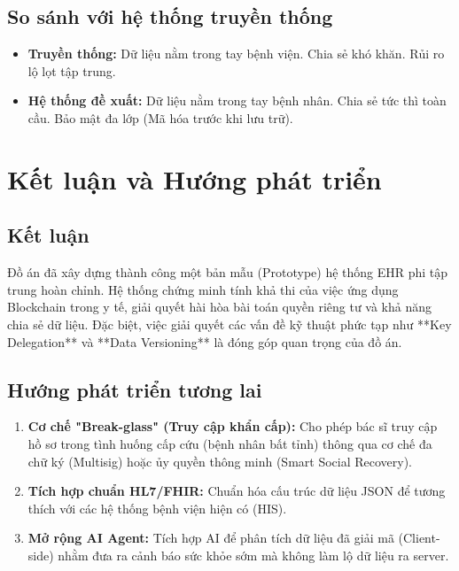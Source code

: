 \documentclass[12pt,a4paper]{report}
\begin{document}
\section{So sánh với hệ thống truyền thống}
\begin{itemize}
    \item \textbf{Truyền thống:} Dữ liệu nằm trong tay bệnh viện. Chia sẻ khó khăn. Rủi ro lộ lọt tập trung.
    \item \textbf{Hệ thống đề xuất:} Dữ liệu nằm trong tay bệnh nhân. Chia sẻ tức thì toàn cầu. Bảo mật đa lớp (Mã hóa trước khi lưu trữ).
\end{itemize}

\chapter{Kết luận và Hướng phát triển}\label{chuong-6}

\section{Kết luận}
Đồ án đã xây dựng thành công một bản mẫu (Prototype) hệ thống EHR phi tập trung hoàn chỉnh. Hệ thống chứng minh tính khả thi của việc ứng dụng Blockchain trong y tế, giải quyết hài hòa bài toán quyền riêng tư và khả năng chia sẻ dữ liệu. Đặc biệt, việc giải quyết các vấn đề kỹ thuật phức tạp như **Key Delegation** và **Data Versioning** là đóng góp quan trọng của đồ án.

\section{Hướng phát triển tương lai}
\begin{enumerate}
    \item \textbf{Cơ chế "Break-glass" (Truy cập khẩn cấp):} Cho phép bác sĩ truy cập hồ sơ trong tình huống cấp cứu (bệnh nhân bất tỉnh) thông qua cơ chế đa chữ ký (Multisig) hoặc ủy quyền thông minh (Smart Social Recovery).
    \item \textbf{Tích hợp chuẩn HL7/FHIR:} Chuẩn hóa cấu trúc dữ liệu JSON để tương thích với các hệ thống bệnh viện hiện có (HIS).
    \item \textbf{Mở rộng AI Agent:} Tích hợp AI để phân tích dữ liệu đã giải mã (Client-side) nhằm đưa ra cảnh báo sức khỏe sớm mà không làm lộ dữ liệu ra server.
\end{enumerate}
\end{document}
